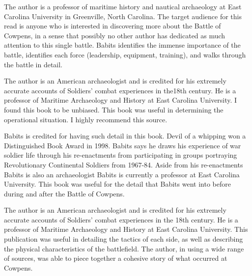 The author is a professor of maritime history and nautical archaeology at East
Carolina University in Greenville, North Carolina. The target audience for this
read is anyone who is interested in discovering more about the Battle of
Cowpens, in a sense that possibly no other author has dedicated as much
attention to this single battle. Babits identifies the immense importance of
the battle, identifies each force (leadership, equipment, training), and walks
through the battle in detail.

The author is an American archaeologist and is credited for his
extremely accurate accounts of Soldiers' combat experiences in the18th century.
He is a professor of Maritime Archaeology and History at East Carolina
University. I found this book to be unbiased.  This book was useful in
determining the operational situation.  I highly recommend this source.   

Babits is credited for having such detail in this book. Devil of a whipping won
a Distinguished Book Award in 1998. Babits says he draws his experience of war
soldier life through his re-enactments from participating in groups portraying
Revolutionary Continental Soldiers from 1967-84. Aside from his re-enactments
Babits is also an archaeologist Babits is currently a professor at East
Carolina University.  This book was useful for the detail that Babits went into
before during and after the Battle of Cowpens.

The author is an American archaeologist and is credited for his extremely
accurate accounts of Soldiers' combat experiences in the 18th century.  He is a
professor of Maritime Archaeology and History at East Carolina University.
This publication was useful in detailing the tactics of each side, as well as
describing the physical characteristics of the battlefield.  The author, in
using a wide range of sources, was able to piece together a cohesive story of
what occurred at Cowpens.
